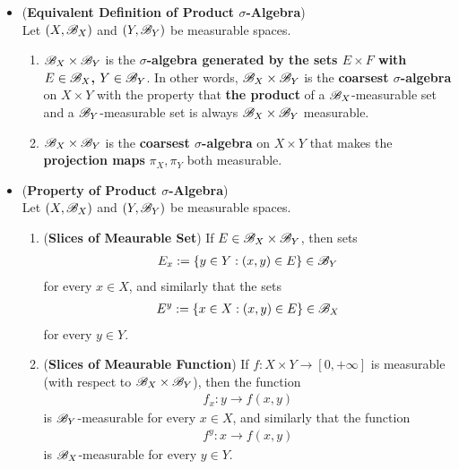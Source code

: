\documentclass[11pt]{article}
\begin{document}
\begin{itemize}
\item \begin{proposition} (\textbf{Equivalent Definition of Product $\sigma$-Algebra}) \citep{tao2011introduction} \\
Let  $(X, {\mathscr B}_X)$ and $(Y, {\mathscr B}_Y)$ be measurable spaces.
\begin{enumerate}
\item ${\mathscr B}_X \times {\mathscr B}_Y$ is the \textbf{$\sigma$-algebra generated by the sets $E \times F$ with $E \in {\mathscr B}_X$,  $Y \in {\mathscr B}_Y$}. In other words, ${\mathscr B}_X \times {\mathscr B}_Y$ is
the \textbf{coarsest $\sigma$-algebra} on $X \times Y$ with the property that \textbf{the product} of a ${\mathscr B}_X$-measurable set and a ${\mathscr B}_Y$-measurable set is
always ${\mathscr B}_X \times {\mathscr B}_Y$ measurable.

\item ${\mathscr B}_X \times {\mathscr B}_Y$ is the \textbf{coarsest $\sigma$-algebra} on $X \times Y$  that makes the \textbf{projection maps} $\pi_X, \pi_Y$ both measurable. 
\end{enumerate}
\end{proposition}


\item \begin{proposition} (\textbf{Property of Product $\sigma$-Algebra}) \citep{tao2011introduction} \\
Let  $(X, {\mathscr B}_X)$ and $(Y, {\mathscr B}_Y)$ be measurable spaces.
\begin{enumerate}
\item (\textbf{Slices of Meaurable Set}) If $E \in {\mathscr B}_X \times {\mathscr B}_Y$, then sets 
\begin{align*}
E_x := \left\{y \in Y: (x, y) \in E\right\} \in {\mathscr B}_Y
\end{align*} for every $x \in X$, and similarly that the sets
\begin{align*}
E^y := \left\{x \in X: (x, y) \in E\right\} \in {\mathscr B}_X
\end{align*} for every $y \in Y$.

\item (\textbf{Slices of Meaurable Function}) If $f : X \times Y \to [0, +\infty]$ is measurable (with respect to ${\mathscr B}_X \times {\mathscr B}_Y $),  then the function 
\begin{align*}
f_x: y \to f(x, y)
\end{align*} is ${\mathscr B}_Y$-measurable for every $x \in X$, and similarly that the function
\begin{align*}
f^{y}: x \to f(x, y)
\end{align*} is ${\mathscr B}_X$-measurable for every $y \in Y$.


\end{enumerate}
\end{proposition}
\end{itemize}
\end{document}
